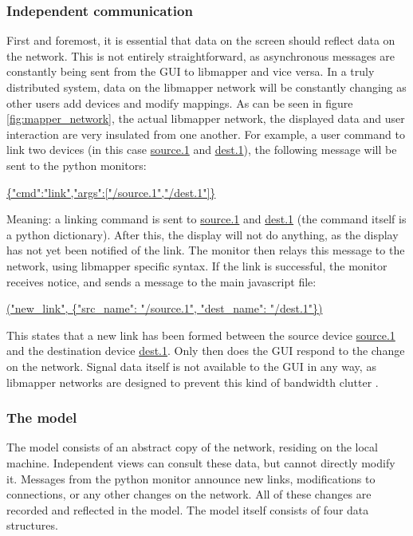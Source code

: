		\subsubsection{Independent communication}

First and foremost, it is essential that data on the screen should reflect data on the network. This is not entirely straightforward, as asynchronous messages are constantly being sent from the GUI to libmapper and vice versa. In a truly distributed system, data on the libmapper network will be constantly changing as other users add devices and modify mappings. As can be seen in figure \ref{fig:mapper_network}, the actual libmapper network, the displayed data and user interaction are very insulated from one another. For example, a user command to link two devices (in this case \url{source.1} and \url{dest.1}), the following message will be sent to the python monitors:

\url{ {"cmd":"link","args":["/source.1","/dest.1"]} }

Meaning: a linking command is sent to \url{source.1} and \url{dest.1} (the command itself is a python dictionary). After this, the display will not do anything, as the display has not yet been notified of the link. The monitor then relays this message to the network, using libmapper specific syntax. If the link is successful, the monitor receives notice, and sends a message to the main javascript file:

\url{("new_link", {"src_name": "/source.1", "dest_name": "/dest.1"}) }

This states that a new link has been formed between the source device \url{source.1} and the destination device \url{dest.1}. Only then does the GUI respond to the change on the network. Signal data itself is not available to the GUI in any way, as libmapper networks are designed to prevent this kind of bandwidth clutter .

		\subsubsection{The model}

The model consists of an abstract copy of the network, residing on the local machine. Independent views can consult these data, but cannot directly modify it. Messages from the python monitor announce new links, modifications to connections, or any other changes on the network. All of these changes are recorded and reflected in the model. The model itself consists of four data structures.

